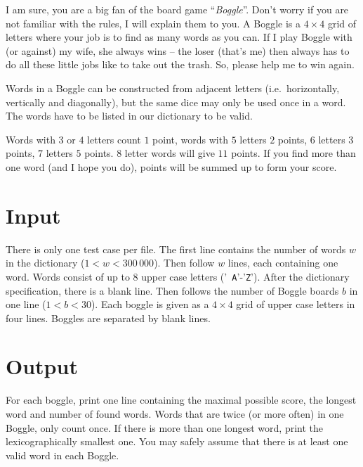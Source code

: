 
I am sure, you are a big fan of the board game ``\emph{Boggle}''. Don't worry
if you are not familiar with the rules, I will explain them to you. A Boggle is
a $4 \times 4$ grid of letters where your job is to find as many words as you
can. If I play Boggle with (or against) my wife, she always wins -- the loser
(that's me) then always has to do all these little jobs like to take out the
trash. So, please help me to win again.

Words in a Boggle can be constructed from adjacent letters (i.e.\ horizontally,
vertically and diagonally), but the same dice may only be used once in a word.
The words have to be listed in our dictionary to be valid.

Words with $3$ or $4$ letters count $1$ point, words with $5$ letters $2$
points, $6$ letters $3$ points, $7$ letters $5$ points. $8$ letter
words will give $11$ points. If you find more than one word (and I hope you
do), points will be summed up to form your score.

\section*{Input}
There is only one test case per file. The first line contains the number of
words $w$ in the dictionary ($1 < w < 300\,000$). Then follow $w$ lines, each
containing one word. Words consist of up to $8$ upper case letters ('{\tt
A}'-'{\tt Z}'). After the dictionary specification, there is a blank line.
Then follows the number of Boggle boards $b$ in one line ($1 < b <
30$). Each boggle is given as a $4\times 4$ grid of upper case letters
in four lines. Boggles are separated by blank lines.

\section*{Output}
For each boggle, print one line containing the maximal possible score, the
longest word and number of found words. Words that are twice (or more often) in
one Boggle, only count once. If there is more than one longest word, print the
lexicographically smallest one. You may safely assume that there is at least
one valid word in each Boggle.
